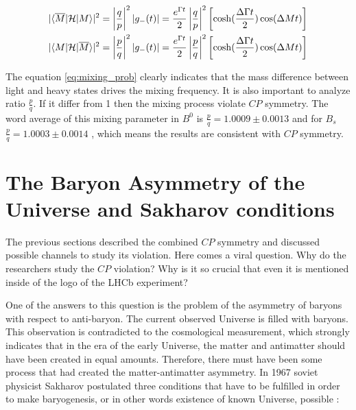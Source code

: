 \begin{align}
\label{eq:mixing_prob}
|\langle\overline{M}\rvert \mathcal{H} \lvert M\rangle|^{2} = \left|\frac{q}{p}\right|^{2} |g_{-}(t)| = \frac{e^{\Gamma t}}{2} \left|\frac{q}{p}\right|^{2}  \left[ \cosh(\frac{\Delta \Gamma t}{2})\cos(\Delta M t) \right] \\ 
|\langle M\rvert \mathcal{H} \lvert\overline{M}\rangle|^{2} = \left|\frac{p}{q}\right|^{2} |g_{-}(t)| = \frac{e^{\Gamma t}}{2} \left|\frac{p}{q}\right|^{2}  \left[ \cosh(\frac{\Delta \Gamma t}{2})\cos(\Delta M t) \right]
\end{align}

The equation \ref{eq:mixing_prob} clearly indicates that the mass difference between light and heavy states drives the mixing frequency. It is also important to analyze ratio $\frac{p}{q}$. If it differ from 1 then the mixing process violate $CP$ symmetry. The word average of this mixing parameter in $B^{0}$ is  $\frac{p}{q} = 1.0009 \pm 0.0013$ and  for $B_s$  $\frac{p}{q} = 1.0003 \pm 0.0014$ \cite{PDG}, which means the results are consistent with $CP$ symmetry. 

\section{The Baryon Asymmetry of the Universe and Sakharov conditions}

The previous sections described the combined $CP$ symmetry and discussed possible channels to study its violation. Here comes a viral question. Why do the researchers study the $CP$ violation? Why is it so crucial that even it is mentioned inside of the logo of the LHCb experiment? 

One of the answers to this question is the problem of the asymmetry of baryons with respect to anti-baryon. The current observed Universe is filled with baryons.  This observation is contradicted to the cosmological measurement, which strongly indicates that in the era of the early Universe, the matter and antimatter should have been created in equal amounts. Therefore, there must have been some process that had created the matter-antimatter asymmetry.  
In 1967 soviet physicist Sakharov postulated three conditions that have to be fulfilled in order to make baryogenesis, or in other words existence of known Universe,  possible \cite{sakharov}: 

